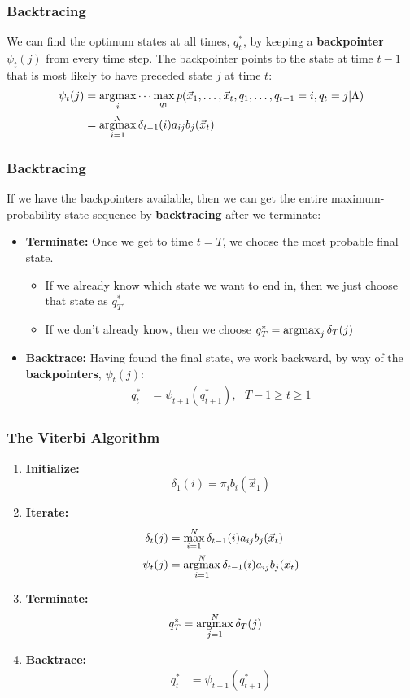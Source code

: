 \documentclass{beamer}
\newcommand{\argmax}{\operatornamewithlimits{argmax}}
\begin{document}
\begin{frame}
  \frametitle{Backtracing}

  We can find the optimum states at all times, $q_t^*$, by keeping a
  {\bf backpointer} $\psi_t(j)$ from every time step.  The backpointer
  points to the state at time $t-1$ that is most likely to have
  preceded state $j$ at time $t$:
  \begin{align*}
    \psi_{t}(j) &= \argmax_i\cdots\max_{q_1}p(\vec{x}_1,\ldots,\vec{x}_t,q_1,\ldots,q_{t-1}=i,q_t=j|\Lambda)\\
    &= \argmax_{i=1}^N \delta_{t-1}(i) a_{ij}b_j(\vec{x}_t)
  \end{align*}
\end{frame}

\begin{frame}
  \frametitle{Backtracing}

  If we have the backpointers available, then we can get the entire
  maximum-probability state sequence by {\bf backtracing} after we
  terminate:
  \begin{itemize}
  \item {\bf Terminate:} Once we get to time $t=T$, we choose the most
    probable final state.
    \begin{itemize}
    \item If we already know which state we want to end in, then we
      just choose that state as $q_T^*$.
    \item If we don't already know, then we choose
      $q_T^*=\argmax_{j}\delta_T(j)$
    \end{itemize}
  \item {\bf Backtrace:} Having found the final state, we work
    backward, by way of the {\bf backpointers}, $\psi_t(j)$:
    \begin{align*}
      q_t^* &= \psi_{t+1}\left(q_{t+1}^*\right),~~~T-1\ge t\ge 1
    \end{align*}
  \end{itemize}
\end{frame}

\begin{frame}
  \frametitle{The Viterbi Algorithm}
  \begin{enumerate}
  \item {\bf Initialize:}
    \[
    \delta_1(i) = \pi_i b_i(\vec{x}_1)
    \]
  \item {\bf Iterate:}
    \begin{align*}
      \delta_{t}(j) &= \max_{i=1}^N \delta_{t-1}(i) a_{ij}b_j(\vec{x}_t)\\
      \psi_{t}(j) &= \argmax_{i=1}^N \delta_{t-1}(i) a_{ij}b_j(\vec{x}_t)
    \end{align*}
  \item {\bf Terminate:}
    \begin{align*}
      q_T^* &= \argmax_{j=1}^N \delta_T(j)
    \end{align*}
  \item {\bf Backtrace:}
    \begin{align*}
      q_t^* &= \psi_{t+1}\left(q_{t+1}^*\right)
    \end{align*}
  \end{enumerate}
\end{frame}
\end{document}
